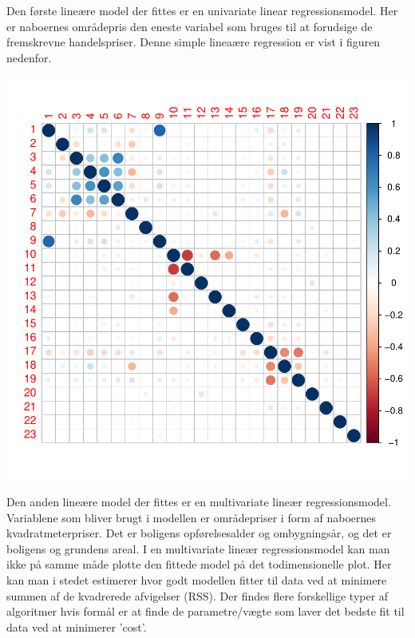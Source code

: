 \documentclass{report}
\begin{document}
Den første lineære model der fittes er en univariate linear regressionsmodel. Her er naboernes områdepris den eneste variabel som bruges til at forudsige de fremskrevne handelspriser. 
Denne simple lineaære regression er vist i figuren nedenfor. 

\includegraphics{rapport_latex-007}

Den anden lineære model der fittes er en multivariate lineær regressionsmodel. 
Variablene som bliver brugt i modellen er områdepriser i form af naboernes kvadratmeterpriser. Det er boligens opførelsesalder og ombygningsår, og det er boligens og grundens areal. 
I en multivariate lineær regressionsmodel kan man ikke på samme måde plotte den fittede model på det todimensionelle plot. Her kan man i stedet estimerer hvor godt modellen fitter til data ved at minimere summen af de kvadrerede afvigelser (RSS). 
Der findes flere forskellige typer af algoritmer hvis formål er at finde de parametre/vægte som laver det bedste fit til data ved at minimerer 'cost'. 
\end{document}
